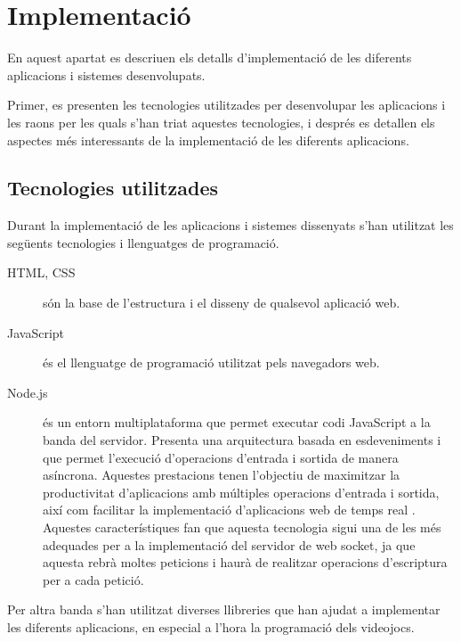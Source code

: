 \documentclass[12pt,a4paper,catalan]{article}
\begin{document}
	\section{Implementació}
	En aquest apartat es descriuen els detalls d'implementació de les diferents aplicacions i sistemes desenvolupats.
	
	Primer, es presenten les tecnologies utilitzades per desenvolupar les aplicacions i les raons per les quals s'han triat aquestes tecnologies, i després es detallen els aspectes més interessants de la implementació de les diferents aplicacions.
	
	\subsection{Tecnologies utilitzades}
	Durant la implementació de les aplicacions i sistemes dissenyats s'han utilitzat les següents tecnologies i llenguatges de programació.
	\begin{description}
		\item[HTML, CSS] són la base de l'estructura i el disseny de qualsevol aplicació web.
		\item[JavaScript] és el llenguatge de programació utilitzat pels navegadors web.
		\item[Node.js] és un entorn multiplataforma que permet executar codi JavaScript a la banda del servidor. Presenta una arquitectura basada en esdeveniments i que permet l'execució d'operacions d'entrada i sortida de manera asíncrona. Aquestes prestacions tenen l'objectiu de maximitzar la productivitat d'aplicacions amb múltiples operacions d'entrada i sortida, així com facilitar la implementació d'aplicacions web de temps real \cite{nodejs}.\\
		Aquestes característiques fan que aquesta tecnologia sigui una de les més adequades per a la implementació del servidor de web socket, ja que aquesta rebrà moltes peticions i haurà de realitzar operacions d'escriptura per a cada petició.
	\end{description}
	Per altra banda s'han utilitzat diverses llibreries que han ajudat a implementar les diferents aplicacions, en especial a l'hora la programació dels videojocs.\\
\end{document}
